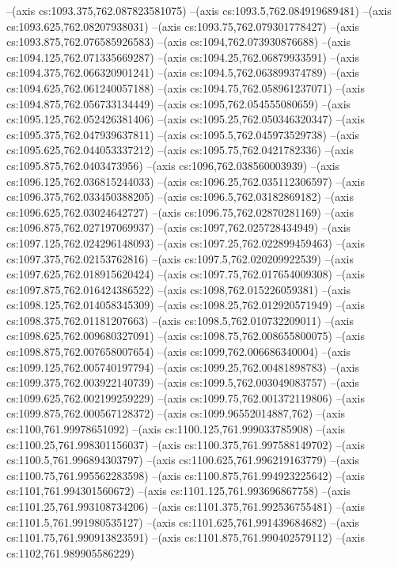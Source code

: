 --(axis cs:1093.375,762.087823581075)
--(axis cs:1093.5,762.084919689481)
--(axis cs:1093.625,762.08207938031)
--(axis cs:1093.75,762.079301778427)
--(axis cs:1093.875,762.076585926583)
--(axis cs:1094,762.073930876688)
--(axis cs:1094.125,762.071335669287)
--(axis cs:1094.25,762.06879933591)
--(axis cs:1094.375,762.066320901241)
--(axis cs:1094.5,762.063899374789)
--(axis cs:1094.625,762.061240057188)
--(axis cs:1094.75,762.058961237071)
--(axis cs:1094.875,762.056733134449)
--(axis cs:1095,762.054555080659)
--(axis cs:1095.125,762.052426381406)
--(axis cs:1095.25,762.050346320347)
--(axis cs:1095.375,762.047939637811)
--(axis cs:1095.5,762.045973529738)
--(axis cs:1095.625,762.044053337212)
--(axis cs:1095.75,762.0421782336)
--(axis cs:1095.875,762.0403473956)
--(axis cs:1096,762.038560003939)
--(axis cs:1096.125,762.036815244033)
--(axis cs:1096.25,762.035112306597)
--(axis cs:1096.375,762.033450388205)
--(axis cs:1096.5,762.03182869182)
--(axis cs:1096.625,762.03024642727)
--(axis cs:1096.75,762.02870281169)
--(axis cs:1096.875,762.027197069937)
--(axis cs:1097,762.025728434949)
--(axis cs:1097.125,762.024296148093)
--(axis cs:1097.25,762.022899459463)
--(axis cs:1097.375,762.02153762816)
--(axis cs:1097.5,762.020209922539)
--(axis cs:1097.625,762.018915620424)
--(axis cs:1097.75,762.017654009308)
--(axis cs:1097.875,762.016424386522)
--(axis cs:1098,762.015226059381)
--(axis cs:1098.125,762.014058345309)
--(axis cs:1098.25,762.012920571949)
--(axis cs:1098.375,762.01181207663)
--(axis cs:1098.5,762.010732209011)
--(axis cs:1098.625,762.009680327091)
--(axis cs:1098.75,762.008655800075)
--(axis cs:1098.875,762.007658007654)
--(axis cs:1099,762.006686340004)
--(axis cs:1099.125,762.005740197794)
--(axis cs:1099.25,762.00481898783)
--(axis cs:1099.375,762.003922140739)
--(axis cs:1099.5,762.003049083757)
--(axis cs:1099.625,762.002199259229)
--(axis cs:1099.75,762.001372119806)
--(axis cs:1099.875,762.000567128372)
--(axis cs:1099.96552014887,762)
--(axis cs:1100,761.99978651092)
--(axis cs:1100.125,761.999033785908)
--(axis cs:1100.25,761.998301156037)
--(axis cs:1100.375,761.997588149702)
--(axis cs:1100.5,761.996894303797)
--(axis cs:1100.625,761.996219163779)
--(axis cs:1100.75,761.995562283598)
--(axis cs:1100.875,761.994923225642)
--(axis cs:1101,761.994301560672)
--(axis cs:1101.125,761.993696867758)
--(axis cs:1101.25,761.993108734206)
--(axis cs:1101.375,761.992536755481)
--(axis cs:1101.5,761.991980535127)
--(axis cs:1101.625,761.991439684682)
--(axis cs:1101.75,761.990913823591)
--(axis cs:1101.875,761.990402579112)
--(axis cs:1102,761.989905586229)
